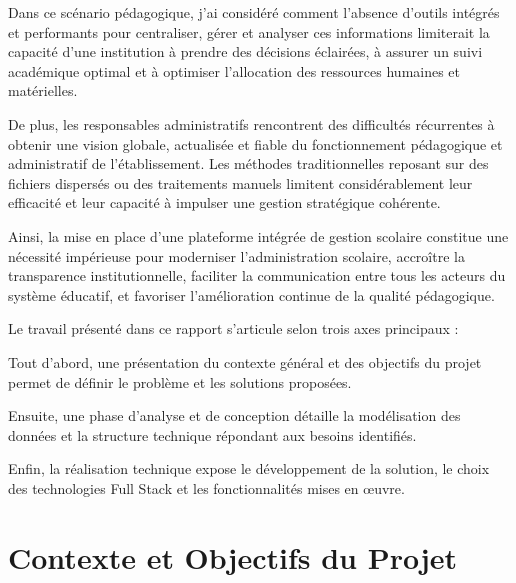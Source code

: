 \documentclass[12pt,a4paper]{report}
\begin{document}
    Dans ce scénario pédagogique, j'ai considéré comment l'absence d'outils intégrés et performants pour centraliser, gérer et analyser ces informations limiterait la capacité d'une institution à prendre des décisions éclairées, à assurer un suivi académique optimal et à optimiser l'allocation des ressources humaines et matérielles.

    De plus, les responsables administratifs rencontrent des difficultés récurrentes à obtenir une vision globale, actualisée et fiable du fonctionnement pédagogique et administratif de l'établissement. Les méthodes traditionnelles reposant sur des fichiers dispersés ou des traitements manuels limitent considérablement leur efficacité et leur capacité à impulser une gestion stratégique cohérente.

    Ainsi, la mise en place d'une plateforme intégrée de gestion scolaire constitue une nécessité impérieuse pour moderniser l'administration scolaire, accroître la transparence institutionnelle, faciliter la communication entre tous les acteurs du système éducatif, et favoriser l'amélioration continue de la qualité pédagogique.

    \vspace{0.8cm}

    Le travail présenté dans ce rapport s'articule selon trois axes principaux :

    Tout d'abord, une présentation du contexte général et des objectifs du projet permet de définir le problème et les solutions proposées.

    Ensuite, une phase d'analyse et de conception détaille la modélisation des données et la structure technique répondant aux besoins identifiés.

    Enfin, la réalisation technique expose le développement de la solution, le choix des technologies Full Stack et les fonctionnalités mises en œuvre.


    \newpage
    \tableofcontents
    \newpage
    \listoffigures


    \chapter{Contexte et Objectifs du Projet}
\end{document}
